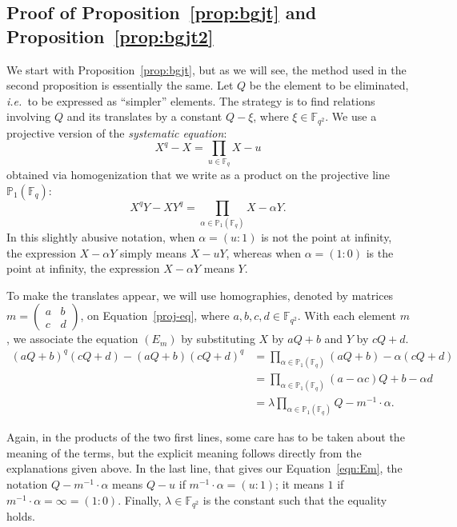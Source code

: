 \documentclass[a4paper,11pt]{article}
\theoremstyle{break}
\theoremstyle{sc}
\theoremstyle{definition}
\theoremstyle{remark}
\newcommand{\ie}{\emph{i.e.\ }}
\begin{document}
\subsection{Proof of Proposition~\ref{prop:bgjt} and Proposition~\ref{prop:bgjt2}}

We start with Proposition~\ref{prop:bgjt}, but as we will see, the method
used in the second proposition is essentially the same. Let $Q$ be the element to
be eliminated, \ie to be expressed as ``simpler'' elements.
The strategy is to find relations involving $Q$ and its
translates by a constant $Q-\xi$, where $\xi\in\mathbb{F}_{q^2}$. We use a
projective version of the
\emph{systematic equation}:
\[
  X^q - X = \prod_{u\in\mathbb{F}_q} X-u 
\]
obtained via homogenization that we write as a product on the projective
line $\mathbb{P}_1(\mathbb{F}_q)$:
  \begin{equation} 
  X^qY-XY^q = \prod_{\alpha\in\mathbb{P}_1(\mathbb{F}_q)} X - \alpha Y.
    \label{proj-eq}
  \end{equation}
In this slightly abusive notation, when $\alpha=(u:1)$ is not the point at
infinity, the expression $X-\alpha Y$ simply means $X-uY$, whereas when
$\alpha=(1:0)$ is the point at infinity, the expression $X-\alpha Y$ means $Y$.

To make the translates appear, we will use homographies, denoted by
matrices $m=\begin{pmatrix} a&b\\c&d\end{pmatrix}$, on
Equation~\eqref{proj-eq}, where $a, b, c, d\in\mathbb{F}_{q^2}$. With each element $m$, we associate the equation
$(E_m)$ by substituting $X$ by $aQ+b$ and $Y$ by $cQ+d$.
\begin{align}
  (aQ+b)^q(cQ+d)-(aQ+b)(cQ+d)^q &=
  \prod_{\alpha\in\mathbb{P}_1(\mathbb{F}_q)}(aQ+b)-\alpha(cQ+d)\nonumber\\
  &= \prod_{\alpha\in\mathbb{P}_1(\mathbb{F}_q)}(a-\alpha c)Q+b-\alpha
  d\nonumber\\
  \label{eqn:Em}
  \tag{$E_m$}
  &=
  \lambda\prod_{\alpha\in\mathbb{P}_1(\mathbb{F}_q)}Q-m^{-1}\cdot\alpha.
\end{align}

Again, in the products of the two first lines, some care has to be taken about
the meaning of the terms, but the explicit meaning
follows directly from the explanations given
above. In the last line, that gives our Equation~\eqref{eqn:Em}, the notation
$Q-m^{-1}\cdot\alpha$ means $Q-u$ if $m^{-1}\cdot\alpha=(u:1)$; it
means $1$ if $m^{-1}\cdot\alpha=\infty=(1:0)$.
Finally, $\lambda\in\mathbb{F}_{q^2}$ is the constant such that the equality
holds.
\end{document}
